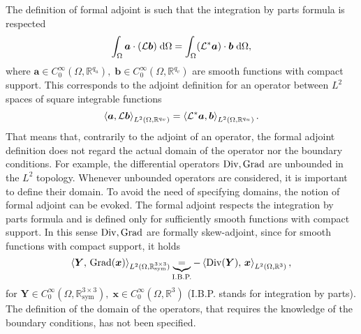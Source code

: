 \begin{remark}
The definition of formal adjoint is such that the integration by parts formula is respected
\[
\int_{\Omega} \bm{a} \cdot (\mathcal{L}\bm{b}) \d\Omega = \int_{\Omega} (\mathcal{L}^*\bm{a}) \cdot \bm{b} \d\Omega,
\]
where $\bm{a} \in C^{\infty}_0(\Omega, \mathbb{R}^{q_u}), \; \bm{b} \in C^{\infty}_0(\Omega, \mathbb{R}^{q_v})$ are smooth functions with compact support. This corresponds to the adjoint definition for an operator between $L^2$ spaces of square integrable functions
\[
\inner[L^2(\Omega, \mathbb{R}^{q_v})]{\bm{a}}{\mathcal{L}\bm{b}} = \inner[L^2(\Omega, \mathbb{R}^{q_u})]{\mathcal{L}^*\bm{a}}{\bm{b}}.
\]
That means that, contrarily to the adjoint of an operator, the formal adjoint definition does not regard the actual domain of the operator nor the boundary conditions. For example, the differential operators $\Div, \Grad$ are unbounded in the ${L}^2$ topology. Whenever unbounded operators are considered, it is important to define their domain. To avoid the need of specifying domains, the notion of formal adjoint can be evoked. The formal adjoint respects the integration by parts formula and is defined only for sufficiently smooth functions with compact support. In this sense $\Div, \Grad$ are formally skew-adjoint, since for smooth functions with compact support, it holds
\begin{equation*}
\left\langle \bm{Y}, \, \Grad(\bm{x}) \right\rangle_{{L}^2(\Omega, \mathbb{R}^{3\times 3}_{\text{sym}})} 
\underbrace{=}_{\text{I.B.P.}} -\left\langle\Div(\bm{Y}), \, \bm{x} \right\rangle_{{L}^2(\Omega, \mathbb{R}^3)},
\end{equation*}
for $\bm{Y} \in C_0^\infty(\Omega, \mathbb{R}^{3\times 3}_{\text{sym}}), \; \bm{x} \in C_0^\infty(\Omega, \mathbb{R}^{3})$ (I.B.P. stands for integration by parts). The definition of the domain of the operators, that requires the knowledge of the boundary conditions, has not been specified. 
\end{remark}


